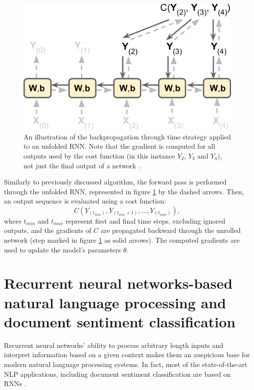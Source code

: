 \begin{figure}[]
\centering
\includegraphics[scale=0.9]{figures/bptt.png}
\caption{An illustration of the backpropagation through time strategy applied to an unfolded RNN. Note that the gradient is computed for all outputs used by the cost function (in this instance $Y_{2}$, $Y_{3}$ and $Y_{4}$), not just the final output of a network \cite{handson_geron}.}
\label{bptt:1}
\end{figure}

Similarly to previously discussed algorithm, the forward pass is performed through the unfolded RNN, represented in figure \ref{bptt:1} by the dashed arrows. Then, an output sequence is evaluated using a cost function:
\begin{equation}
C(Y_{(t_{min})}, Y_{(t_{min} + 1)}, \dots, Y_{(t_{max})}),
\end{equation}
where $t_{min}$ and $t_{max}$ represent first and final time steps, excluding ignored outputs, and the gradients of $C$ are propagated backward through the unrolled network (step marked in figure \ref{bptt:1} as solid arrows). The computed gradients are used to update the model's parameters $\theta$.

\chapter{Recurrent neural networks-based natural language processing and document sentiment classification} 
\label{chapter:rnnnlp}

Recurrent neural networks' ability to process arbitrary length inputs and interpret information based on a given context makes them an auspicious base for modern natural language processing systems. In fact, most of the state-of-the-art NLP applications, including document sentiment classification are based on RNNs \cite{handson_geron}.

